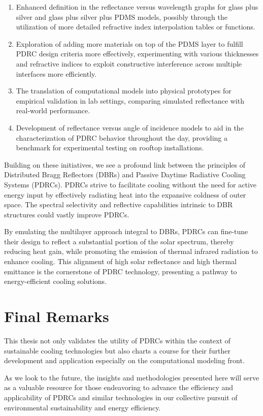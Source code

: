 \begin{enumerate}
    \item Enhanced definition in the reflectance versus wavelength graphs for glass plus silver and glass plus silver plus PDMS models, possibly through the utilization of more detailed refractive index interpolation tables or functions.
    \item Exploration of adding more materials on top of the PDMS layer to fulfill PDRC design criteria more effectively, experimenting with various thicknesses and refractive indices to exploit constructive interference across multiple interfaces more efficiently.
    \item The translation of computational models into physical prototypes for empirical validation in lab settings, comparing simulated reflectance with real-world performance.
    \item Development of reflectance versus angle of incidence models to aid in the characterization of PDRC behavior throughout the day, providing a benchmark for experimental testing on rooftop installations.
\end{enumerate}

Building on these initiatives, we see a profound link between the principles of Distributed Bragg Reflectors (DBRs) and Passive Daytime Radiative Cooling Systems (PDRCs). PDRCs strive to facilitate cooling without the need for active energy input by effectively radiating heat into the expansive coldness of outer space. The spectral selectivity and reflective capabilities intrinsic to DBR structures could vastly improve PDRCs.

By emulating the multilayer approach integral to DBRs, PDRCs can fine-tune their design to reflect a substantial portion of the solar spectrum, thereby reducing heat gain, while promoting the emission of thermal infrared radiation to enhance cooling. This alignment of high solar reflectance and high thermal emittance is the cornerstone of PDRC technology, presenting a pathway to energy-efficient cooling solutions.

\section{Final Remarks}

This thesis not only validates the utility of PDRCs within the context of sustainable cooling technologies but also charts a course for their further development and application especially on the computational modeling front.

As we look to the future, the insights and methodologies presented here will serve as a valuable resource for those endeavoring to advance the efficiency and applicability of PDRCs and similar technologies in our collective pursuit of environmental sustainability and energy efficiency.